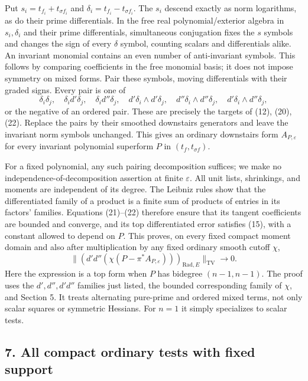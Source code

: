 \documentclass[
  11pt,
]{article}
\begin{document}
Put \(s_i=t_{f_i}+t_{\sigma f_i}\) and
\(\delta_i=t_{f_i}-t_{\sigma f_i}\). The \(s_i\) descend exactly as norm
logarithms, as do their prime differentials. In the free real
polynomial/exterior algebra in \(s_i,\delta_i\) and their prime
differentials, simultaneous conjugation fixes the \(s\) symbols and
changes the sign of every \(\delta\) symbol, counting scalars and
differentials alike. An invariant monomial contains an even number of
anti-invariant symbols. This follows by comparing coefficients in the
free monomial basis; it does not impose symmetry on mixed forms. Pair
these symbols, moving differentials with their graded signs. Every pair
is one of \[
 \delta_i\delta_j,\quad \delta_i d'\delta_j,\quad
 \delta_i d''\delta_j,\quad
 d'\delta_i\wedge d'\delta_j,\quad
 d''\delta_i\wedge d''\delta_j,\quad
 d'\delta_i\wedge d''\delta_j,
\] or the negative of an ordered pair. These are precisely the targets
of (12), (20), (22). Replace the pairs by their smoothed downstairs
generators and leave the invariant norm symbols unchanged. This gives an
ordinary downstairs form \(A_{P,\varepsilon}\) for every invariant
polynomial superform \(P\) in \((t_f,t_{\sigma f})\).

For a fixed polynomial, any such pairing decomposition suffices; we make
no independence-of-decomposition assertion at finite \(\varepsilon\).
All unit lists, shrinkings, and moments are independent of its degree.
The Leibniz rules show that the differentiated family of a product is a
finite sum of products of entries in its factors' families. Equations
(21)--(22) therefore ensure that its tangent coefficients are bounded
and converge, and its top differentiated error satisfies (15), with a
constant allowed to depend on \(P\). This proves, on every fixed compact
moment domain and also after multiplication by any fixed ordinary smooth
cutoff \(\chi\), \[
 \big\|(d'd''(\chi(P-\pi^*A_{P,\varepsilon})))_{\mathrm{Rad},E}
       \big\|_{\mathrm{TV}}\longrightarrow0.                \tag{23}
\] Here the expression is a top form when \(P\) has bidegree
\((n-1,n-1)\). The proof uses the \(d',d'',d'd''\) families just listed,
the bounded corresponding family of \(\chi\), and Section 5. It treats
alternating pure-prime and ordered mixed terms, not only scalar squares
or symmetric Hessians. For \(n=1\) it simply specializes to scalar
tests.

\subsection{7. All compact ordinary tests with fixed
support}\label{all-compact-ordinary-tests-with-fixed-support}
\end{document}
